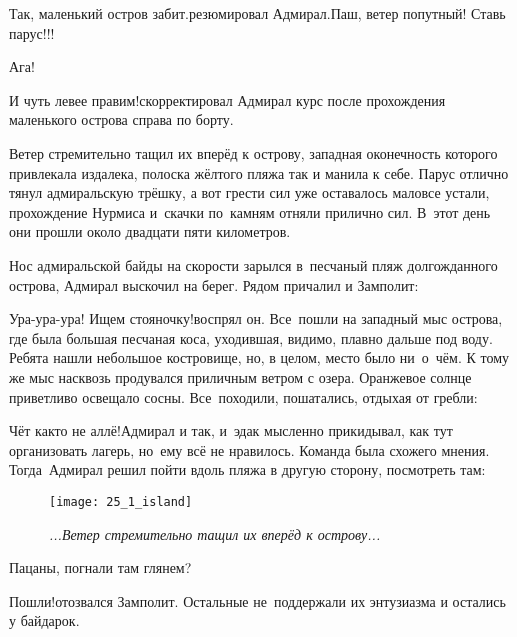 \diagdash Так, маленький остров забит.\mdash резюмировал Адмирал.\mdash Паш, ветер попутный! Ставь парус!!!

\diagdash Ага!

\diagdash И чуть левее правим!\mdash скорректировал Адмирал курс после прохождения маленького острова справа по борту.

Ветер стремительно тащил их вперёд к острову, западная оконечность которого привлекала издалека, полоска жёлтого пляжа так и манила к себе. Парус отлично тянул адмиральскую трёшку, а вот грести сил уже оставалось мало\mdash все устали, прохождение Нурмиса и~скачки по~камням отняли прилично сил. В~этот день они прошли около двадцати пяти километров.

Нос адмиральской байды на скорости зарылся в~песчаный пляж долгожданного острова, Адмирал выскочил на берег. Рядом причалил и Замполит:


\diagdash Ура-ура-ура! Ищем стояночку!\mdash воспрял он. Все~пошли на западный мыс острова, где была большая песчаная коса, уходившая, видимо, плавно дальше под воду. Ребята нашли небольшое костровище, но, в целом, место было ни~о~чём. К тому же мыс насквозь продувался приличным ветром с озера. Оранжевое солнце приветливо освещало сосны. Все~походили, пошатались, отдыхая от гребли:

\diagdash Чёт как\sdash то не аллё!\mdash Адмирал и так, и~эдак мысленно прикидывал, как тут организовать лагерь, но~ему всё не нравилось. Команда была схожего мнения. Тогда~Адмирал решил пойти вдоль пляжа в другую сторону, посмотреть там:

\begin{figure}[h]
	\centering
	\texttt{[image: 25\_1\_island]}
	\caption{\small\textit{...Ветер стремительно тащил их вперёд к острову...}}
\end{figure}

\diagdash Пацаны, погнали там глянем?

\diagdash Пошли!\mdash отозвался Замполит. Остальные не~поддержали их энтузиазма и остались у байдарок.

